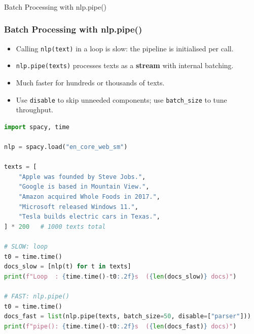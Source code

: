 \begin{frame}[fragile]\frametitle{}
\begin{center}
{\Large Batch Processing with nlp.pipe()}
\end{center}
\end{frame}

\begin{frame}[fragile]\frametitle{Batch Processing with nlp.pipe()}
\begin{itemize}
  \item Calling \texttt{nlp(text)} in a loop is slow: the pipeline is initialised per call.
  \item \texttt{nlp.pipe(texts)} processes texts as a \textbf{stream} with internal batching.
  \item Much faster for hundreds or thousands of texts.
  \item Use \texttt{disable} to skip unneeded components; use \texttt{batch\_size} to tune throughput.
\end{itemize}
\begin{lstlisting}[language=Python, basicstyle=\tiny]
import spacy, time

nlp = spacy.load("en_core_web_sm")

texts = [
    "Apple was founded by Steve Jobs.",
    "Google is based in Mountain View.",
    "Amazon acquired Whole Foods in 2017.",
    "Microsoft released Windows 11.",
    "Tesla builds electric cars in Texas.",
] * 200   # 1000 texts total

# SLOW: loop
t0 = time.time()
docs_slow = [nlp(t) for t in texts]
print(f"Loop  : {time.time()-t0:.2f}s  ({len(docs_slow)} docs)")

# FAST: nlp.pipe()
t0 = time.time()
docs_fast = list(nlp.pipe(texts, batch_size=50, disable=["parser"]))
print(f"pipe(): {time.time()-t0:.2f}s  ({len(docs_fast)} docs)")
\end{lstlisting}
\end{frame}

